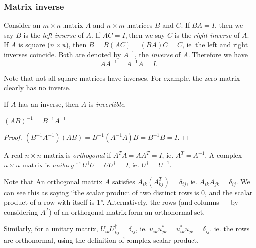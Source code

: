 \documentclass[a4paper]{article}
\begin{document}
\subsubsection{Matrix inverse}

\begin{defi}
  Consider an $m\times n$ matrix $A$ and $n\times m$ matrices $B$ and $C$. If $BA = I$, then we say $B$ is the \emph{left inverse} of $A$. If $AC = I$, then we say $C$ is the \emph{right inverse} of $A$. If $A$ is square ($n\times n$), then $B = B(AC) = (BA)C = C$, ie. the left and right inverses coincide. Both are denoted by $A^{-1}$, the \emph{inverse} of $A$. Therefore we have
  \[
    AA^{-1} = A^{-1}A = I.
  \]
\end{defi}
Note that not all square matrices have inverses. For example, the zero matrix clearly has no inverse.

\begin{defi}
  If $A$ has an inverse, then $A$ is \emph{invertible}.
\end{defi}

\begin{prop}
  $(AB)^{-1} = B^{-1}A^{-1}$
\end{prop}

\begin{proof}
  $(B^{-1}A^{-1})(AB) = B^{-1}(A^{-1}A)B = B^{-1}B = I$.
\end{proof}

\begin{defi}
  A real $n\times n$ matrix is \emph{orthogonal} if $A^TA = AA^T = I$, ie. $A^T = A^{-1}$. A complex $n\times n$ matrix is \emph{unitary} if $U^\dagger U = UU^\dagger = I$, ie. $U^\dagger = U^{-1}$.
\end{defi}
Note that An orthogonal matrix $A$ satisfies $A_{ik}(A^T_{kj}) = \delta_{ij}$, ie. $A_{ik}A_{jk} = \delta_{ij}$. We can see this as saying ``the scalar product of two distinct rows is 0, and the scalar product of a row with itself is 1''. Alternatively, the rows (and columns --- by considering $A^T$) of an orthogonal matrix form an orthonormal set.

Similarly, for a unitary matrix, $U_{ik}U_{kj}^\dagger = \delta_{ij}$, ie. $u_{ik}u_{jk}^* = u_{ik}^*u_{jk} =\delta_{ij}$. ie. the rows are orthonormal, using the definition of complex scalar product.
\end{document}
